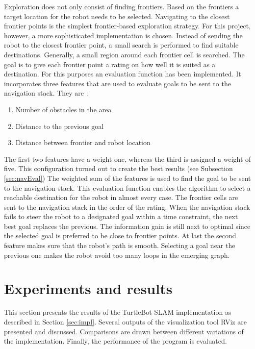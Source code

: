 \documentclass{ba-kecs}
\begin{document}
Exploration does not only consist of finding frontiers. Based on the frontiers a target location for the robot needs to be selected. Navigating to the closest frontier points is the simplest frontier-based exploration strategy. For this project, however, a more sophisticated implementation is chosen. Instead of sending the robot to the closest frontier point, a small search is performed to find suitable destinations. Generally, a small region around each frontier cell is searched. The goal is to give each frontier point a rating on how well it is suited as a destination. For this purposes an evaluation function has been implemented. It incorporates three features that are used to evaluate goals to be sent to the navigation stack. They are :
\begin{enumerate}
\item{Number of obstacles in the area}
\item{Distance to the previous goal}
\item{Distance between frontier and robot location}
\end{enumerate}
The first two features have a weight one, whereas the third is assigned a weight of five. This configuration turned out to create the best results (see Subsection \ref{sec:navEval}) The weighted sum of the features is used to find the goal to be sent to the navigation stack. This evaluation function enables the algorithm to select a reachable destination for the robot in almost every case. The frontier cells are sent to the navigation stack in the order of the rating. When the navigation stack fails to steer the robot to a designated goal within a time constraint, the next best goal replaces the previous. The information gain is still next to optimal since the selected goal is preferred to be close to frontier points. At last the second feature makes sure that the robot's path is smooth. Selecting a goal near the previous one makes the robot avoid too many loops in the emerging graph.

\section{Experiments and results}
\label{sec:exp}
This section presents the results of the TurtleBot SLAM implementation as described in Section \ref{sec:impl}. Several outputs of the visualization tool RViz are presented and discussed. Comparisons are drawn between different variations of the implementation. Finally, the performance of the program is evaluated.
\end{document}
